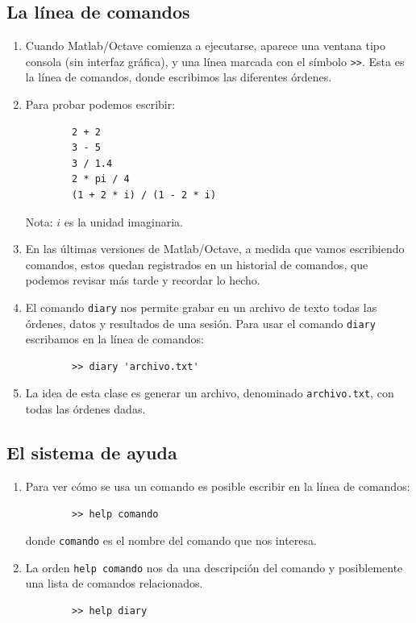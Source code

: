 \documentclass[11pt,a4paper,openany]{book}
\begin{document}
\subsection{La línea de comandos}

\begin{enumerate}
	
	\item Cuando Matlab/Octave comienza a ejecutarse, aparece una ventana tipo consola (sin interfaz gráfica), y una línea marcada con el símbolo \verb->>-. Esta es la línea de comandos, donde escribimos las diferentes órdenes.
	
	\item Para probar podemos escribir:
	\begin{verbatim}
		2 + 2
		3 - 5
		3 / 1.4
		2 * pi / 4
		(1 + 2 * i) / (1 - 2 * i)
	\end{verbatim}
	Nota: $i$ es la unidad imaginaria.
	
	\item En las últimas versiones de Matlab/Octave, a medida que vamos escribiendo comandos, estos quedan registrados en un historial de comandos, que podemos revisar más tarde y recordar lo hecho.
	
	\item El comando \texttt{diary} nos permite grabar en un archivo de texto todas las órdenes, datos y resultados de una sesión. Para usar el comando \texttt{diary} escribamos en la línea de comandos:
	\begin{verbatim}
		>> diary 'archivo.txt'
	\end{verbatim}
	
	\item La idea de esta clase es generar un archivo, denominado \verb-archivo.txt-, con todas las órdenes dadas.
\end{enumerate}

\subsection{El sistema de ayuda}

\begin{enumerate}
	\item Para ver cómo se usa un comando es posible escribir en la línea de comandos:
	\begin{verbatim}
		>> help comando
	\end{verbatim}
	donde \texttt{comando} es el nombre del comando que nos interesa.
	
	\item La orden \texttt{help comando} nos da una descripción del comando y posiblemente una lista de comandos relacionados.
	\begin{verbatim}
		>> help diary
	\end{verbatim}
\end{enumerate}
\end{document}
